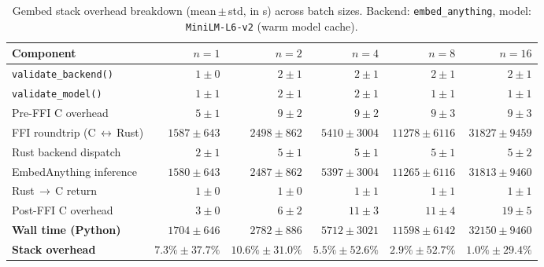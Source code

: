 \begin{table}[t]
  \centering
  \small
  \caption{Gembed stack overhead breakdown (mean\,$\pm$\,std, in \textmu{}s)           across batch sizes. Backend: \texttt{embed\_anything},           model: \texttt{MiniLM\mbox{-}L6\mbox{-}v2} (warm model cache).}
  \label{tab:gembed_overhead}
  \begin{tabular}{lrrrrr}
    \toprule
    \textbf{Component} & $n=1$ & $n=2$ & $n=4$ & $n=8$ & $n=16$ \\
    \midrule
    \texttt{validate\_backend()} & $1\pm0$ & $2\pm1$ & $2\pm1$ & $2\pm1$ & $2\pm1$ \\
    \texttt{validate\_model()} & $1\pm1$ & $2\pm1$ & $2\pm1$ & $1\pm1$ & $1\pm1$ \\
    Pre-FFI C overhead & $5\pm1$ & $9\pm2$ & $9\pm2$ & $9\pm3$ & $9\pm3$ \\
    FFI roundtrip (C\,$\leftrightarrow$\,Rust) & $1587\pm643$ & $2498\pm862$ & $5410\pm3004$ & $11278\pm6116$ & $31827\pm9459$ \\
    Rust backend dispatch & $2\pm1$ & $5\pm1$ & $5\pm1$ & $5\pm1$ & $5\pm2$ \\
    EmbedAnything inference & $1580\pm643$ & $2487\pm862$ & $5397\pm3004$ & $11265\pm6116$ & $31813\pm9460$ \\
    Rust\,$\to$\,C return & $1\pm0$ & $1\pm0$ & $1\pm1$ & $1\pm1$ & $1\pm1$ \\
    Post-FFI C overhead & $3\pm0$ & $6\pm2$ & $11\pm3$ & $11\pm4$ & $19\pm5$ \\
    \midrule
    \textbf{Wall time (Python)} & $1704\pm646$ & $2782\pm886$ & $5712\pm3021$ & $11598\pm6142$ & $32150\pm9460$ \\
    \midrule
    \textbf{Stack overhead} & $7.3\%\pm37.7\%$ & $10.6\%\pm31.0\%$ & $5.5\%\pm52.6\%$ & $2.9\%\pm52.7\%$ & $1.0\%\pm29.4\%$ \\
    \bottomrule
  \end{tabular}
\end{table}
